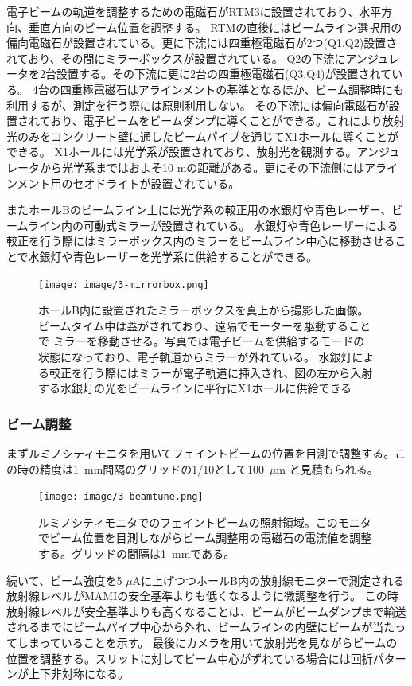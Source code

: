 \documentclass[a4paper,11pt,uplatex]{jsbook}
\begin{document}
電子ビームの軌道を調整するための電磁石がRTM3に設置されており、水平方向、垂直方向のビーム位置を調整する。
RTMの直後にはビームライン選択用の偏向電磁石が設置されている。更に下流には四重極電磁石が2つ(Q1,Q2)設置されており、その間にミラーボックスが設置されている。
Q2の下流にアンジュレータを2台設置する。その下流に更に2台の四重極電磁石(Q3,Q4)が設置されている。
4台の四重極電磁石はアラインメントの基準となるほか、ビーム調整時にも利用するが、測定を行う際には原則利用しない。
その下流には偏向電磁石が設置されており、電子ビームをビームダンプに導くことができる。これにより放射光のみをコンクリート壁に通したビームパイプを通じてX1ホールに導くことができる。
X1ホールには光学系が設置されており、放射光を観測する。アンジュレータから光学系まではおよそ10 mの距離がある。更にその下流側にはアラインメント用のセオドライトが設置されている。

またホールBのビームライン上には光学系の較正用の水銀灯や青色レーザー、ビームライン内の可動式ミラーが設置されている。
水銀灯や青色レーザーによる較正を行う際にはミラーボックス内のミラーをビームライン中心に移動させることで水銀灯や青色レーザーを光学系に供給することができる。
\begin{figure}[h]
  \centering
  \texttt{[image: image/3-mirrorbox.png]}\\
  \caption[ミラーボックスの写真]{ホールB内に設置されたミラーボックスを真上から撮影した画像。ビームタイム中は蓋がされており、遠隔でモーターを駆動することで
  ミラーを移動させる。写真では電子ビームを供給するモードの状態になっており、電子軌道からミラーが外れている。
  水銀灯による較正を行う際にはミラーが電子軌道に挿入され、図の左から入射する水銀灯の光をビームラインに平行にX1ホールに供給できる}
  \label{mirrorbox}
\end{figure}
\subsubsection{ビーム調整}
まずルミノシティモニタを用いてフェイントビームの位置を目測で調整する。この時の精度は1~mm間隔のグリッドの1/10として100~$\mu$m と見積もられる。
\begin{figure}[h]
  \centering
  \texttt{[image: image/3-beamtune.png]}\\
  \caption[ルミノシティモニタ]{ルミノシティモニタでのフェイントビームの照射領域。このモニタでビーム位置を目測しながらビーム調整用の電磁石の電流値を調整する。グリッドの間隔は1~mmである。}
  \label{luminosity}
\end{figure}

続いて、ビーム強度を5 $\si{\mu}\text{A}$に上げつつホールB内の放射線モニターで測定される放射線レベルがMAMIの安全基準よりも低くなるように微調整を行う。
この時放射線レベルが安全基準よりも高くなることは、ビームがビームダンプまで輸送されるまでにビームパイプ中心から外れ、ビームラインの内壁にビームが当たってしまっていることを示す。
最後にカメラを用いて放射光を見ながらビームの位置を調整する。スリットに対してビーム中心がずれている場合には回折パターンが上下非対称になる。
\end{document}
